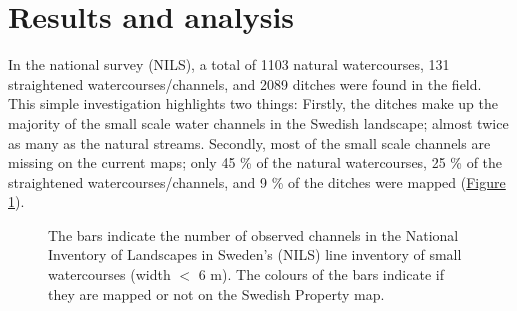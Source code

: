 \documentclass[]{interact}
\theoremstyle{plain}%
\theoremstyle{definition}
\theoremstyle{remark}
\begin{document}
\section{Results and analysis}
In the national survey (NILS), a total of 1103 natural watercourses, 131 straightened watercourses/channels, and 2089 ditches were found in the field. This simple investigation highlights two things: Firstly, the ditches make up the majority of the small scale water channels in the Swedish landscape; almost twice as many as the natural streams. Secondly, most of the small scale channels are missing on the current maps; only 45 \% of the natural watercourses, 25 \% of the straightened watercourses/channels, and 9 \% of the ditches were mapped (\hyperref[fig:watercoursebarplot]{Figure} \ref{fig:watercoursebarplot}).

\begin{figure}[!htb]
    \centering
    \caption{The bars indicate the number of observed channels in the National Inventory of Landscapes in Sweden's (NILS) line inventory of small watercourses (width $<$ 6 m). The colours of the bars indicate if they are mapped or not on the Swedish Property map.}
    \label{fig:watercoursebarplot}
\end{figure}
\end{document}
